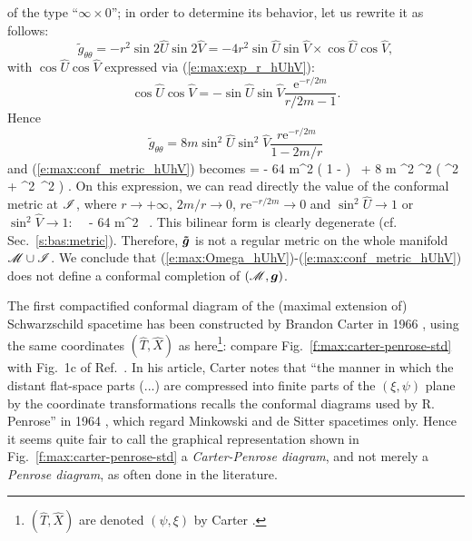 of the type ``$\infty\times 0$''; in order to determine its behavior, let
us rewrite it as follows:
\[
    {\tilde{g}}_{\theta\theta} = -  r^2 \sin 2\hat{U} \sin 2\hat{V}
        = - 4 r^2 \sin\hat{U}\sin\hat{V} \times \cos\hat{U}\cos\hat{V},
\]
with $\cos\hat{U}\cos\hat{V}$ expressed via (\ref{e:max:exp_r_hUhV}):
\[
    \cos\hat{U}\cos\hat{V} = - \sin\hat{U} \sin\hat{V}
    \frac{\mathrm{e}^{-r/2m}}{r/2m - 1} .
\]
Hence
\[
    {\tilde{g}}_{\theta\theta} = 8 m \sin^2\hat{U} \sin^2\hat{V}
    \frac{ r \mathrm{e}^{-r/2m}}{1 - 2m/r}
\]
and (\ref{e:max:conf_metric_hUhV}) becomes
\be
    =
     - 64 m^2 \left( 1 -  \right)
    \dd {} \, \dd {}
     + 8 m \sin^2 \sin^2
     \left( \dd\th^2 + \sin^2\th\, \dd\ph^2 \right) .
\ee
On this expression, we can read directly the value of the conformal metric
at $\mathscr{I}$,  where $r\rightarrow +\infty$, $2m/r \rightarrow 0$,
$r \mathrm{e}^{-r/2m}\rightarrow 0$ and
$\sin^2\hat{U}\rightarrow 1$ or
$\sin^2\hat{V}\rightarrow 1$:
\be \label{e:max:conf_metric_scri}
    \ \stackrel{\scri}{=}\  - 64 m^2 \dd {} \, \dd {} .
\ee
This bilinear form is clearly degenerate (cf. Sec.~\ref{s:bas:metric}).
Therefore, $\bm{\tilde{g}}$ is not a
regular metric on the whole manifold $\mathscr{M}\cup\mathscr{I}$.
We conclude that (\ref{e:max:Omega_hUhV})-(\ref{e:max:conf_metric_hUhV}) does
not define a conformal completion of $(\mathscr{M},\bm{g})$.

\begin{hist} \label{h:max:CP-diag}
The first compactified conformal diagram of the (maximal extension of) Schwarzschild
spacetime has been constructed by Brandon Carter in 1966 \cite{Carte66}, using the same coordinates $(\hat{T},\hat{X})$ as here\footnote{
$(\hat{T},\hat{X})$ are denoted $(\psi,\xi)$ by Carter \cite{Carte66}.}: compare Fig.~\ref{f:max:carter-penrose-std} with Fig.~1c of Ref.~\cite{Carte66}.
In his article, Carter notes that ``the manner in which the distant flat-space
parts (...) are compressed into finite parts of the $(\xi,\psi)$ plane by the
coordinate transformations recalls the conformal diagrams used by R. Penrose''
in 1964 \cite{Penro64}, which regard Minkowski and de Sitter spacetimes only.
Hence it seems quite fair to call the graphical representation shown in Fig.~\ref{f:max:carter-penrose-std}
a \emph{Carter-Penrose diagram}, and not merely
a \emph{Penrose diagram}, as often done in the literature.
\end{hist}

